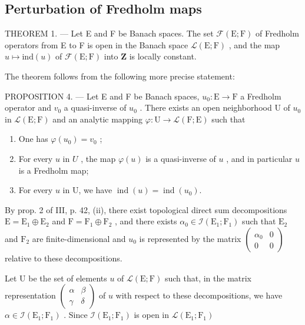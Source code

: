 \subsection{Perturbation of Fredholm maps}

THEOREM 1. --- Let E and F be Banach spaces. The set \(\mathcal{F}(\mathrm{E};\mathrm{F})\) of Fredholm operators from E to F is open in the Banach space \(\mathcal{L}(\mathrm{E};\mathrm{F})\) , and the map \(u\mapsto\mathrm{ind}(u)\) of \(\mathcal{F}(\mathrm{E};\mathrm{F})\) into \(\mathbf{Z}\) is locally constant.

The theorem follows from the following more precise statement:

PROPOSITION 4. --- Let E and F be Banach spaces, \(u_{0}\colon\mathrm{E}\to\mathrm{F}\) a Fredholm operator and \(v_{0}\) a quasi-inverse of \(u_{0}\) . There exists an open neighborhood U of \(u_{0}\) in \(\mathcal{L}(\mathrm{E};\mathrm{F})\) and an analytic mapping \(\varphi\colon\mathrm{U}\to\mathcal{L}(\mathrm{F};\mathrm{E})\) such that

\begin{enumerate}
\def\labelenumi{(\roman{enumi})}
\item
  One has \(\varphi(u_{0}) = v_{0}\) ;
\item
  For every \(u\) in \(U\) , the map \(\varphi(u)\) is a quasi-inverse of \(u\) , and in particular \(u\) is a Fredholm map;
\item
  For every \(u\) in U, we have \(\operatorname{ind}(u) = \operatorname{ind}(u_0)\).
\end{enumerate}

By prop. 2 of III, p. 42, (ii), there exist topological direct sum decompositions \(\mathrm{E} = \mathrm{E}_1 \oplus \mathrm{E}_2\) and \(\mathrm{F} = \mathrm{F}_1 \oplus \mathrm{F}_2\) , and there exists \(\alpha_0 \in \mathcal{I}(\mathrm{E}_1; \mathrm{F}_1)\) such that \(\mathrm{E}_2\) and \(\mathrm{F}_2\) are finite-dimensional and \(u_0\) is represented by the matrix \(\left( \begin{array}{cc}\alpha_0 & 0\\ 0 & 0 \end{array} \right)\) relative to these decompositions.

Let U be the set of elements \(u\) of \(\mathcal{L}(\mathrm{E};\mathrm{F})\) such that, in the matrix representation \(\left( \begin{array}{cc}\alpha & \beta \\ \gamma & \delta \end{array} \right)\) of \(u\) with respect to these decompositions, we have \(\alpha \in \mathcal{I}(\mathrm{E}_1;\mathrm{F}_1)\) . Since \(\mathcal{I}(\mathrm{E}_1;\mathrm{F}_1)\) is open in \(\mathcal{L}(\mathrm{E}_1;\mathrm{F}_1)\)

